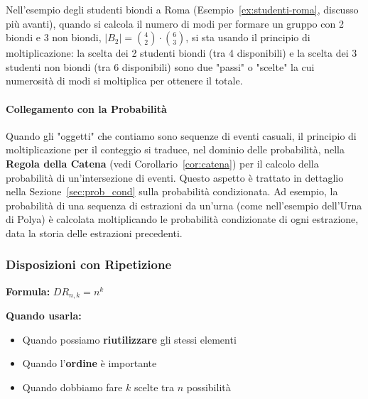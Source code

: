Nell'esempio degli studenti biondi a Roma (Esempio~\ref{ex:studenti-roma}, discusso più avanti), quando si calcola il numero di modi per formare un gruppo con 2 biondi e 3 non biondi, $|B_2| = \binom{4}{2} \cdot \binom{6}{3}$, si sta usando il principio di moltiplicazione: la scelta dei 2 studenti biondi (tra 4 disponibili) e la scelta dei 3 studenti non biondi (tra 6 disponibili) sono due "passi" o "scelte" la cui numerosità di modi si moltiplica per ottenere il totale.

\paragraph{Collegamento con la Probabilità}
Quando gli "oggetti" che contiamo sono sequenze di eventi casuali, il principio di moltiplicazione per il conteggio si traduce, nel dominio delle probabilità, nella \textbf{Regola della Catena} (vedi Corollario~\ref{cor:catena}) per il calcolo della probabilità di un'intersezione di eventi. Questo aspetto è trattato in dettaglio nella Sezione~\ref{sec:prob_cond} sulla probabilità condizionata. Ad esempio, la probabilità di una sequenza di estrazioni da un'urna (come nell'esempio dell'Urna di Polya) è calcolata moltiplicando le probabilità condizionate di ogni estrazione, data la storia delle estrazioni precedenti.

\subsubsection{Disposizioni con Ripetizione}
\textbf{Formula:} $DR_{n,k} = n^k$

\textbf{Quando usarla:}
\begin{itemize}
    \item Quando possiamo \textbf{riutilizzare} gli stessi elementi
    \item Quando l'\textbf{ordine} è importante
    \item Quando dobbiamo fare $k$ scelte tra $n$ possibilità
\end{itemize}

